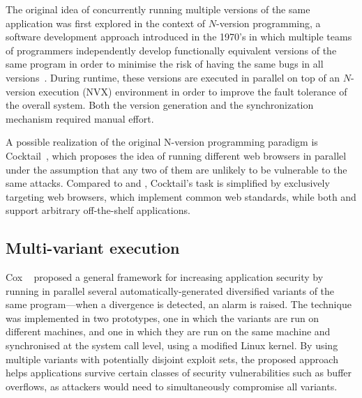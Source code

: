 
The original idea of concurrently running multiple versions of the same
application was first explored in the context of $N$-version programming, a
software development approach introduced in the 1970's in which multiple teams
of programmers independently develop functionally equivalent versions of the
same program in order to minimise the risk of having the same bugs in all
versions~\cite{chen1995}. During runtime, these versions are executed in
parallel on top of an $N$-version execution (NVX) environment in order to
improve the fault tolerance of the overall system. Both the version generation
and the synchronization mechanism required manual effort.

A possible realization of the original N-version programming paradigm is
Cocktail~\cite{cocktail}, which proposes the idea of running different web
browsers in parallel under the assumption that any two of them are unlikely to
be vulnerable to the same attacks. Compared to \mx and \varan, Cocktail's task
is simplified by exclusively targeting web browsers, which implement common web
standards, while both \mx and \varan support arbitrary off-the-shelf
applications.



\subsection{Multi-variant execution}

Cox \etal~\cite{cox2006} proposed a general framework for increasing
application security by running in parallel several automatically-generated
diversified variants of the same program---when a divergence is detected, an
alarm is raised. The technique was implemented in two prototypes, one in which
the variants are run on different machines, and one in which they are run on
the same machine and synchronised at the system call level, using a modified
Linux kernel. By using multiple variants with potentially disjoint exploit
sets, the proposed approach helps applications survive certain classes of
security vulnerabilities such as buffer overflows, as attackers would need to
simultaneously compromise all variants.


